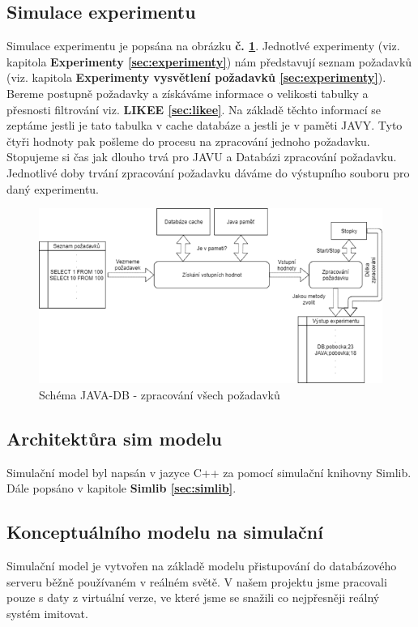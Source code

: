 \documentclass[a4paper, 11pt]{article}
\begin{document}
\subsection{Simulace experimentu} 
	Simulace experimentu je popsána na obrázku \textbf{č. \ref{sec:obr10}}.
	 Jednotlvé experimenty (viz. kapitola \textbf{Experimenty \ref{sec:experimenty}}) nám představují seznam požadavků (viz. kapitola \textbf{Experimenty vysvětlení požadavků \ref{sec:experimenty}}). 
	Bereme postupně požadavky a získáváme informace o velikosti tabulky a přesnosti filtrování viz. \textbf{LIKEE \ref{sec:likee}}. Na základě těchto informací se zeptáme jestli je tato tabulka v cache databáze a jestli je v paměti JAVY. Tyto čtyři hodnoty pak pošleme do procesu na zpracování jednoho požadavku. Stopujeme si čas jak dlouho trvá pro JAVU a Databázi zpracování požadavku. Jednotlivé doby trvání zpracování požadavku dáváme do výstupního souboru pro daný experimentu. %

\begin{figure}[H]
\centering
\includegraphics[width=150mm]{images/JAVA-DB-schema.png}
\caption{Schéma JAVA-DB - zpracování všech požadavků}
\label{sec:obr10}
\end{figure}


\subsection{Architektůra sim modelu}
Simulační model byl napsán v jazyce C++\cite{c++} za pomocí simulační knihovny Simlib\cite{simlib_web, simlib_zdroj}. Dále popsáno v kapitole \textbf{Simlib \ref{sec:simlib}}.

\subsection{Konceptuálního modelu na simulační}
Simulační model je vytvořen na základě modelu přistupování do databázového serveru běžně používaném v reálném světě. V našem projektu jsme pracovali pouze s daty z virtuální verze, ve které jsme se snažili co nejpřesněji reálný systém imitovat.
\end{document}

